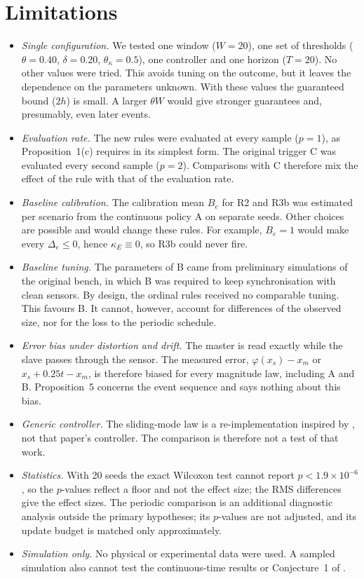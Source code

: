 \documentclass[10pt,a4paper]{article}
\newcommand{\R}[1]{\textup{R#1}}
\begin{document}
\section{Limitations}\label{sec:limits}
\begin{itemize}[leftmargin=*,itemsep=2pt]
\item \emph{Single configuration.} We tested one window ($W=20$), one set of thresholds ($\theta=0.40$, $\delta=0.20$, $\theta_\kappa=0.5$), one controller and one horizon ($T=20$). No other values were tried. This avoids tuning on the outcome, but it leaves the dependence on the parameters unknown. With these values the guaranteed bound ($2h$) is small. A larger $\theta W$ would give stronger guarantees and, presumably, even later events.
\item \emph{Evaluation rate.} The new rules were evaluated at every sample ($p=1$), as Proposition~1(c) requires in its simplest form. The original trigger C was evaluated every second sample ($p=2$). Comparisons with C therefore mix the effect of the rule with that of the evaluation rate.
\item \emph{Baseline calibration.} The calibration mean $B_e$ for \R{2} and \R{3}b was estimated per scenario from the continuous policy A on separate seeds. Other choices are possible and would change these rules. For example, $B_e=1$ would make every $\Delta_e\le0$, hence $\kappa_E\equiv0$, so \R{3}b could never fire.
\item \emph{Baseline tuning.} The parameters of B came from preliminary simulations of the original bench, in which B was required to keep synchronisation with clean sensors. By design, the ordinal rules received no comparable tuning. This favours B. It cannot, however, account for differences of the observed size, nor for the loss to the periodic schedule.
\item \emph{Error bias under distortion and drift.} The master is read exactly while the slave passes through the sensor. The measured error, $\varphi(x_s)-x_m$ or $x_s+0.25t-x_m$, is therefore biased for every magnitude law, including A and B. Proposition~5 concerns the event sequence and says nothing about this bias.
\item \emph{Generic controller.} The sliding-mode law is a re-implementation inspired by \citep{taghavifar2026}, not that paper's controller. The comparison is therefore not a test of that work.
\item \emph{Statistics.} With 20 seeds the exact Wilcoxon test cannot report $p<1.9\times10^{-6}$, so the $p$-values reflect a floor and not the effect size; the RMS differences give the effect sizes. The periodic comparison is an additional diagnostic analysis outside the primary hypotheses; its $p$-values are not adjusted, and its update budget is matched only approximately.
\item \emph{Simulation only.} No physical or experimental data were used. A sampled simulation also cannot test the continuous-time results or Conjecture~1 of \citep{pv2026miet}.
\end{itemize}
\end{document}
